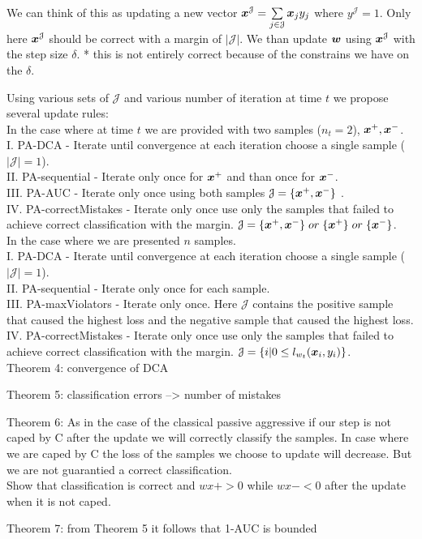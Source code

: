 We can think of this as updating a new vector $\bm{x}^\mathcal{J} = \sum\limits_{j \in \mathcal{J} }{\bm{x}_j y_j}$ where $y^\mathcal{J} = 1 $. Only here $\bm{x}^\mathcal{J}$ should be correct with a margin of $|\mathcal{J}| $.  We than update $\bm{w}$ using $\bm{x}^\mathcal{J}$ with the step size $\delta$.
* this is not entirely correct because of the constrains we have on the $\delta$.

Using various sets of $ \mathcal{J} $ and various number of iteration at time $t$ we propose several update rules:\\

In the case where at time $t$ we are provided with two samples ($n_t=2$), $\bm{x}^+, \bm{x}^-$.\\
I. PA-DCA - Iterate until convergence at each iteration choose a single sample ($|\mathcal{J}|=1$).\\
II. PA-sequential - Iterate only once for $\bm{x}^+$ and than once for $\bm{x}^-$.\\
III. PA-AUC - Iterate only once using both samples $\mathcal{J} = \{\bm{x}^+, \bm{x}^-\} $ .\\
IV. PA-correctMistakes - Iterate only once use only the samples that failed to achieve correct classification with the margin. $\mathcal{J} = \{\bm{x}^+, \bm{x}^-\} \; or \;\{\bm{x}^+ \} \; or \; \{ \bm{x}^- \}$.\\

In the case where we are presented $n$ samples. \\
I. PA-DCA - Iterate until convergence at each iteration choose a single sample ($|\mathcal{J}|=1$).\\
II. PA-sequential - Iterate only once for each sample.\\
III. PA-maxViolators - Iterate only once. Here $\mathcal{J}$ contains the positive sample that caused the highest loss and the negative sample that caused the highest loss. \\
IV. PA-correctMistakes - Iterate only once use only the samples that failed to achieve correct classification with the margin. $\mathcal{J} = \{ i | 0 \leq l_{w_t}(\bm{x}_i, y_i) \}$.\\


Theorem 4: convergence of DCA

Theorem 5: classification errors --> number of mistakes

Theorem 6: As in the case of the classical passive aggressive if our step is not caped by C after the update we will correctly classify the samples. In case where we are caped by C the loss of the samples we choose to update will decrease. But we are not guarantied a correct classification. \\
Show that classification is correct and $ w x+ >0$ while $w x- < 0$ after the update when it is not caped.

Theorem 7: from Theorem 5 it follows that 1-AUC is bounded

